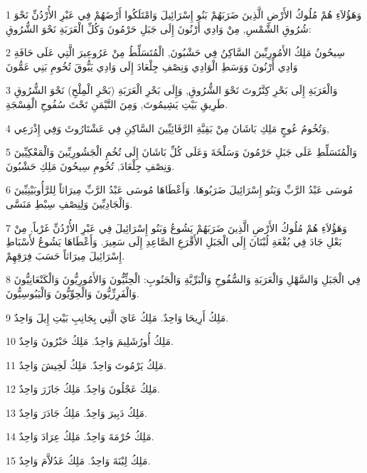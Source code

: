 \par 1 وَهَؤُلاَءِ هُمْ مُلُوكُ الأَرْضِ الَّذِينَ ضَرَبَهُمْ بَنُو إِسْرَائِيلَ وَامْتَلَكُوا أَرْضَهُمْ فِي عَبْرِ الأُرْدُنِّ نَحْوَ شُرُوقِ الشَّمْسِ, مِنْ وَادِي أَرْنُونَ إِلَى جَبَلِ حَرْمُونَ وَكُلِّ الْعَرَبَةِ نَحْوَ الشُّرُوقِ:
\par 2 سِيحُونُ مَلِكُ الأَمُورِيِّينَ السَّاكِنُ فِي حَشْبُونَ, الْمُتَسَلِّطُ مِنْ عَرُوعِيرَ الَّتِي عَلَى حَافَةِ وَادِي أَرْنُونَ وَوَسَطِ الْوَادِي وَنِصْفِ جِلْعَادَ إِلَى وَادِي يَبُّوقَ تُخُومِ بَنِي عَمُّونَ
\par 3 وَالْعَرَبَةِ إِلَى بَحْرِ كِنَّرُوتَ نَحْوَ الشُّرُوقِ, وَإِلَى بَحْرِ الْعَرَبَةِ (بَحْرِ الْمِلْحِ) نَحْوَ الشُّرُوقِ طَرِيقِ بَيْتِ يَشِيمُوتَ, وَمِنَ التَّيْمَنِ تَحْتَ سُفُوحِ الْفِسْجَةِ.
\par 4 وَتُخُومُ عُوجٍ مَلِكِ بَاشَانَ مِنْ بَقِيَّةِ الرَّفَائِيِّينَ السَّاكِنِ فِي عَشْتَارُوثَ وَفِي إِذْرَعِي,
\par 5 وَالْمُتَسَلِّطِ عَلَى جَبَلِ حَرْمُونَ وَسَلْخَةَ وَعَلَى كُلِّ بَاشَانَ إِلَى تُخُمِ الْجَشُورِيِّينَ وَالْمَعْكِيِّينَ وَنِصْفِ جِلْعَادَ, تُخُومِ سِيحُونَ مَلِكِ حَشْبُونَ.
\par 6 مُوسَى عَبْدُ الرَّبِّ وَبَنُو إِسْرَائِيلَ ضَرَبُوهَا. وَأَعْطَاهَا مُوسَى عَبْدُ الرَّبِّ مِيرَاثاً لِلرَّأُوبَيْنِيِّينَ وَالْجَادِيِّينَ وَلِنِصْفِ سِبْطِ مَنَسَّى.
\par 7 وَهَؤُلاَءِ هُمْ مُلُوكُ الأَرْضِ الَّذِينَ ضَرَبَهُمْ يَشُوعُ وَبَنُو إِسْرَائِيلَ فِي عَبْرِ الأُرْدُنِّ غَرْباً, مِنْ بَعْلِ جَادَ فِي بُقْعَةِ لُبْنَانَ إِلَى الْجَبَلِ الأَقْرَعِ الصَّاعِدِ إِلَى سَعِيرَ. وَأَعْطَاهَا يَشُوعُ لأَسْبَاطِ إِسْرَائِيلَ مِيرَاثاً حَسَبَ فِرَقِهِمْ.
\par 8 فِي الْجَبَلِ وَالسَّهْلِ وَالْعَرَبَةِ وَالسُّفُوحِ وَالْبَرِّيَّةِ وَالْجَنُوبِ: الْحِثِّيُّونَ وَالأَمُورِيُّونَ وَالْكَنْعَانِيُّونَ وَالْفَرِزِّيُّونَ وَالْحِوِّيُّونَ وَالْيَبُوسِيُّونَ.
\par 9 مَلِكُ أَرِيحَا وَاحِدٌ. مَلِكُ عَايَ الَّتِي بِجَانِبِ بَيْتِ إِيلَ وَاحِدٌ.
\par 10 مَلِكُ أُورُشَلِيمَ وَاحِدٌ. مَلِكُ حَبْرُونَ وَاحِدٌ.
\par 11 مَلِكُ يَرْمُوتَ وَاحِدٌ. مَلِكُ لَخِيشَ وَاحِدٌ.
\par 12 مَلِكُ عَجْلُونَ وَاحِدٌ. مَلِكُ جَازَرَ وَاحِدٌ.
\par 13 مَلِكُ دَبِيرَ وَاحِدٌ. مَلِكُ جَادَرَ وَاحِدٌ.
\par 14 مَلِكُ حُرْمَةَ وَاحِدٌ. مَلِكُ عِرَادَ وَاحِدٌ.
\par 15 مَلِكُ لِبْنَةَ وَاحِدٌ. مَلِكُ عَدُلاَّمَ وَاحِدٌ.
